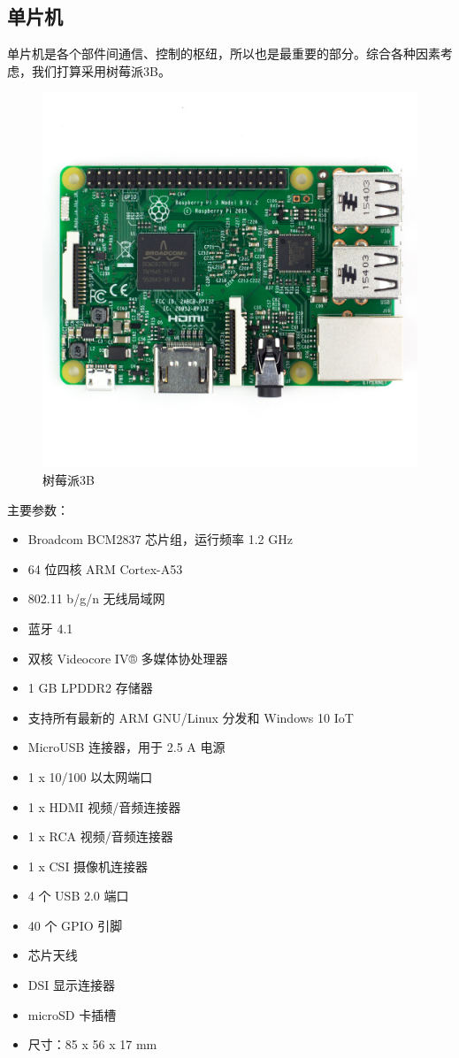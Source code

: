 \documentclass{ctexart}
\begin{document}
\subsection{单片机}
单片机是各个部件间通信、控制的枢纽，所以也是最重要的部分。综合各种因素考虑，我们打算采用树莓派3B。
\begin{figure}[H]
\centering
    \includegraphics[width = \textwidth]{035}
    \caption{树莓派3B}\par
\end{figure}
主要参数：
\begin{center}
\begin{itemize}
\item Broadcom BCM2837 芯片组，运行频率 1.2 GHz
\item 64 位四核 ARM Cortex-A53
\item 802.11 b/g/n 无线局域网
\item 蓝牙 4.1
\item 双核 Videocore IV® 多媒体协处理器
\item 1 GB LPDDR2 存储器
\item 支持所有最新的 ARM GNU/Linux 分发和 Windows 10 IoT
\item MicroUSB 连接器，用于 2.5 A 电源
\item 1 x 10/100 以太网端口
\item 1 x HDMI 视频/音频连接器
\item 1 x RCA 视频/音频连接器
\item 1 x CSI 摄像机连接器
\item 4 个 USB 2.0 端口
\item 40 个 GPIO 引脚
\item 芯片天线
\item DSI 显示连接器
\item microSD 卡插槽
\item 尺寸：85 x 56 x 17 mm
\end{itemize}
\end{center}
\end{document}
